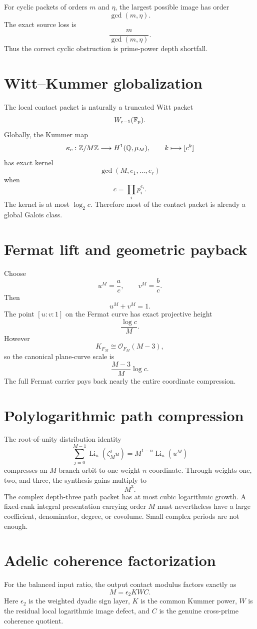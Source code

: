 For cyclic packets of orders $m$ and $\eta$, the largest possible image has order
\[
\gcd(m,\eta).
\]
The exact source loss is
\[
\boxed{
\frac{m}{\gcd(m,\eta)}.
}
\]
Thus the correct cyclic obstruction is prime-power depth shortfall.

\section{Witt--Kummer globalization}
The local contact packet is naturally a truncated Witt packet
\[
W_{e-1}(\mathbb F_p).
\]
Globally, the Kummer map
\[
\kappa_c:\mathbb Z/M\mathbb Z\longrightarrow H^1(\mathbb Q,\mu_M),
\qquad
k\longmapsto[c^k]
\]
has exact kernel
\[
\boxed{
\gcd(M,e_1,\ldots,e_r)
}
\]
when
\[
c=\prod_ip_i^{e_i}.
\]
The kernel is at most $\log_2c$. Therefore most of the contact packet is already a global Galois class.

\section{Fermat lift and geometric payback}
Choose
\[
u^M=\frac ac,
\qquad
v^M=\frac bc.
\]
Then
\[
u^M+v^M=1.
\]
The point $[u:v:1]$ on the Fermat curve has exact projective height
\[
\boxed{
\frac{\log c}{M}.
}
\]
However
\[
K_{F_M}\cong\mathcal O_{F_M}(M-3),
\]
so the canonical plane-curve scale is
\[
\frac{M-3}{M}\log c.
\]
The full Fermat carrier pays back nearly the entire coordinate compression.

\section{Polylogarithmic path compression}
The root-of-unity distribution identity
\[
\boxed{
\sum_{j=0}^{M-1}\operatorname{Li}_n(\zeta_M^ju)
=
M^{1-n}\operatorname{Li}_n(u^M)
}
\]
compresses an $M$-branch orbit to one weight-$n$ coordinate. Through weights one, two, and three, the synthesis gains multiply to
\[
M^3.
\]
The complex depth-three path packet has at most cubic logarithmic growth. A fixed-rank integral presentation carrying order $M$ must nevertheless have a large coefficient, denominator, degree, or covolume. Small complex periods are not enough.

\section{Adelic coherence factorization}
For the balanced input ratio, the output contact modulus factors exactly as
\[
\boxed{
M=\epsilon_2KWC.
}
\]
Here $\epsilon_2$ is the weighted dyadic sign layer, $K$ is the common Kummer power, $W$ is the residual local logarithmic image defect, and $C$ is the genuine cross-prime coherence quotient.

